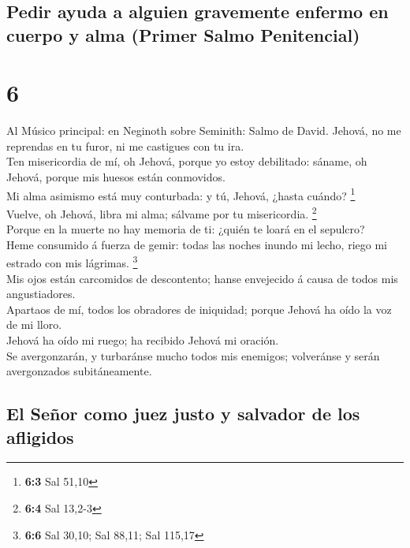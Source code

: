 \hypertarget{pedir-ayuda-a-alguien-gravemente-enfermo-en-cuerpo-y-alma-primer-salmo-penitencial}{%
\subsection{Pedir ayuda a alguien gravemente enfermo en cuerpo y alma
(Primer Salmo
Penitencial)}\label{pedir-ayuda-a-alguien-gravemente-enfermo-en-cuerpo-y-alma-primer-salmo-penitencial}}

\hypertarget{section-5}{%
\section{6}\label{section-5}}

 Al Músico principal: en Neginoth sobre Seminith: Salmo de
David. Jehová, no me reprendas en tu furor, ni me castigues con tu
ira.\\
 Ten misericordia de mí, oh Jehová, porque yo estoy
debilitado: sáname, oh Jehová, porque mis huesos están conmovidos.\\
 Mi alma asimismo está muy conturbada: y tú, Jehová, ¿hasta
cuándo? \footnote{\textbf{6:3} Sal 51,10}\\
 Vuelve, oh Jehová, libra mi alma; sálvame por tu
misericordia. \footnote{\textbf{6:4} Sal 13,2-3}\\
 Porque en la muerte no hay memoria de ti: ¿quién te loará
en el sepulcro?\\
 Heme consumido á fuerza de gemir: todas las noches inundo
mi lecho, riego mi estrado con mis lágrimas. \footnote{\textbf{6:6} Sal
  30,10; Sal 88,11; Sal 115,17}\\
 Mis ojos están carcomidos de descontento; hanse envejecido
á causa de todos mis angustiadores.\\
 Apartaos de mí, todos los obradores de iniquidad; porque
Jehová ha oído la voz de mi lloro.\\
 Jehová ha oído mi ruego; ha recibido Jehová mi oración.\\
 Se avergonzarán, y turbaránse mucho todos mis enemigos;
volveránse y serán avergonzados subitáneamente.

\hypertarget{el-seuxf1or-como-juez-justo-y-salvador-de-los-afligidos}{%
\subsection{El Señor como juez justo y salvador de los
afligidos}\label{el-seuxf1or-como-juez-justo-y-salvador-de-los-afligidos}}

